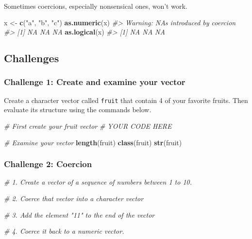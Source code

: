\documentclass[]{book}
\newenvironment{Shaded}{\begin{snugshade}}{\end{snugshade}}
\newcommand{\CommentTok}[1]{\textcolor[rgb]{0.56,0.35,0.01}{\textit{#1}}}
\newcommand{\KeywordTok}[1]{\textcolor[rgb]{0.13,0.29,0.53}{\textbf{#1}}}
\newcommand{\NormalTok}[1]{#1}
\newcommand{\StringTok}[1]{\textcolor[rgb]{0.31,0.60,0.02}{#1}}
\begin{document}
Sometimes coercions, especially nonsensical ones, won't work.

\begin{Shaded}
\begin{Highlighting}[]
\NormalTok{x <-}\StringTok{ }\KeywordTok{c}\NormalTok{(}\StringTok{"a"}\NormalTok{, }\StringTok{"b"}\NormalTok{, }\StringTok{"c"}\NormalTok{)}
\KeywordTok{as.numeric}\NormalTok{(x)}
\CommentTok{#> Warning: NAs introduced by coercion}
\CommentTok{#> [1] NA NA NA}
\KeywordTok{as.logical}\NormalTok{(x)}
\CommentTok{#> [1] NA NA NA}
\end{Highlighting}
\end{Shaded}

\hypertarget{challenges-5}{%
\subsection{Challenges}\label{challenges-5}}

\hypertarget{challenge-1-create-and-examine-your-vector}{%
\subsubsection*{Challenge 1: Create and examine your vector}\label{challenge-1-create-and-examine-your-vector}}

Create a character vector called \texttt{fruit} that contain 4 of your favorite fruits. Then evaluate its structure using the commands below.

\begin{Shaded}
\begin{Highlighting}[]

\CommentTok{# First create your fruit vector }
\CommentTok{# YOUR CODE HERE}


\CommentTok{# Examine your vector}
\KeywordTok{length}\NormalTok{(fruit)}
\KeywordTok{class}\NormalTok{(fruit)}
\KeywordTok{str}\NormalTok{(fruit)}
\end{Highlighting}
\end{Shaded}

\hypertarget{challenge-2-coercion}{%
\subsubsection*{Challenge 2: Coercion}\label{challenge-2-coercion}}

\begin{Shaded}
\begin{Highlighting}[]

\CommentTok{# 1. Create a vector of a sequence of numbers between 1 to 10.}

\CommentTok{# 2. Coerce that vector into a character vector}

\CommentTok{# 3. Add the element "11" to the end of the vector}

\CommentTok{# 4. Coerce it back to a numeric vector.}
\end{Highlighting}
\end{Shaded}
\end{document}
